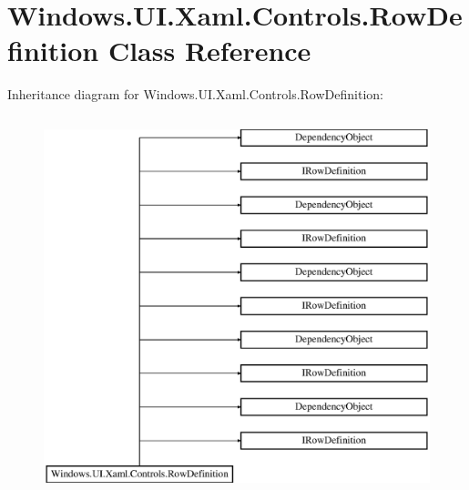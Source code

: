 \hypertarget{class_windows_1_1_u_i_1_1_xaml_1_1_controls_1_1_row_definition}{}\section{Windows.\+U\+I.\+Xaml.\+Controls.\+Row\+Definition Class Reference}
\label{class_windows_1_1_u_i_1_1_xaml_1_1_controls_1_1_row_definition}
Inheritance diagram for Windows.\+U\+I.\+Xaml.\+Controls.\+Row\+Definition\+:\begin{figure}[H]
\begin{center}
\leavevmode
\includegraphics[height=11.000000cm]{class_windows_1_1_u_i_1_1_xaml_1_1_controls_1_1_row_definition}
\end{center}
\end{figure}
